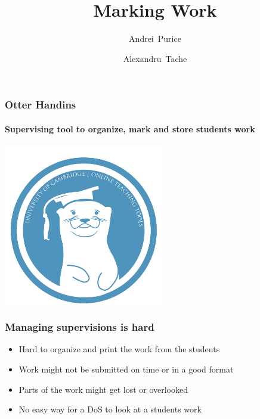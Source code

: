 \documentclass{beamer}
\title %
{Marking Work}
\author[Author, Anders] %
{Andrei~Purice \and Alexandru~Tache}
\begin{document}
	\begin{frame}
		\frametitle{Otter Handins}
    \framesubtitle{Supervising tool to organize, mark and store students work}
		\begin{center}	
		 \includegraphics[height=7cm]{otter.jpg}
		\end{center}
    \end{frame}
	\begin{frame}
    	\frametitle{Managing supervisions is hard}
 
   	   	\begin{itemize}
   	   		\item Hard to organize and print the work from the students
          \item Work might not be submitted on time or in a good format
   	   		\item Parts of the work might get lost or overlooked
   	   		\item No easy way for a DoS to look at a students work
  	   	 \end{itemize}	   	 
  	\end{frame}
  	
\end{document}
